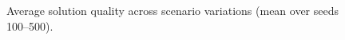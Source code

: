 \begin{figure}[t]
\centering

\caption{Average solution quality across scenario variations (mean over seeds 100--500).}
\label{fig:quality-analysis}
\end{figure}
